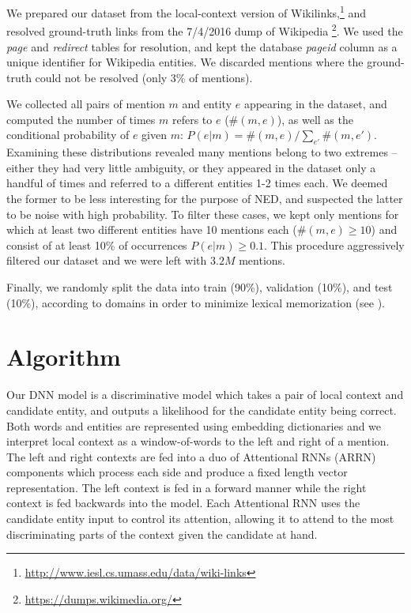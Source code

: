 \documentclass[11pt]{article}
\begin{document}

We prepared our dataset from the local-context version of Wikilinks,\footnote{\url{http://www.iesl.cs.umass.edu/data/wiki-links}} and resolved ground-truth links from the 7/4/2016 dump of Wikipedia \footnote{\url{https://dumps.wikimedia.org/}}. We used the \emph{page} and \emph{redirect} tables for resolution, and kept the database \emph{pageid} column as a unique identifier for Wikipedia entities. We discarded mentions where the ground-truth could not be resolved (only 3\% of mentions).

We collected all pairs of mention $m$ and entity $e$ appearing in the dataset, and computed the number of times $m$ refers to $e$ ($\#(m,e)$), as well as the conditional probability of $e$ given $m$: $P(e|m)=\#(m,e)/\sum_{e'}\#(m,e')$. Examining these distributions revealed many mentions belong to two extremes -- either they had very little ambiguity, or they appeared in the dataset only a handful of times and referred to a different entities 1-2 times each. We deemed the former to be less interesting for the purpose of NED, and suspected the latter to be noise with high probability. To filter these cases, we kept only mentions for which at least two different entities have 10 mentions each ($\#(m,e) \ge 10$) and consist of at least 10\% of occurrences $P(e|m) \ge 0.1$. This procedure aggressively filtered our dataset and we were left with $3.2M$ mentions.

Finally, we randomly split the data into train (90\%), validation (10\%), and test (10\%), according to domains in order to minimize lexical memorization (see \cite{levy2015supervised}).

\section{Algorithm}

Our DNN model is a discriminative model which takes a pair of local context and candidate entity, and outputs a likelihood for the candidate entity being correct. Both words and entities are represented using embedding dictionaries and we interpret local context as a window-of-words to the left and right of a mention. The left and right contexts are fed into a duo of Attentional RNNs (ARRN) components which process each side and produce a fixed length vector representation. The left context is fed in a forward manner while the right context is fed backwards into the model. Each Attentional RNN uses the candidate entity input to control its attention, allowing it to attend to the most discriminating parts of the context given the candidate at hand. 
\end{document}
